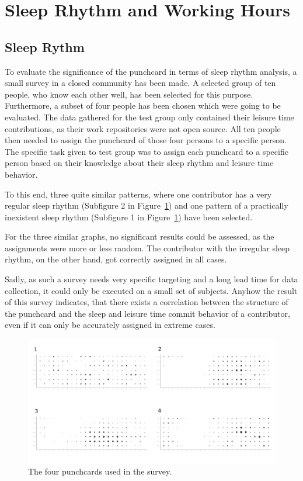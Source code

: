 \section{Sleep Rhythm and Working Hours}

\subsection{Sleep Rythm}
To evaluate the significance of the punchcard in terms of sleep rhythm analysis, a small survey in a closed community has been made.
A selected group of ten people, who know each other well, has been selected for this purpose.
Furthermore, a subset of four people has been chosen which were going to be evaluated.
The data gathered for the test group only contained their leisure time contributions, as their work repositories were not open source.
All ten people then needed to assign the punchcard of those four persons to a specific person.
The specific task given to test group was to assign each punchcard to a specific person based on their knowledge about their sleep rhythm and leisure time behavior.

To this end, three quite similar patterns, where one contributor has a very regular sleep rhythm (Subfigure 2 in Figure~\ref{fig:punchcard-survey}) and one pattern of a practically inexistent sleep rhythm (Subfigure 1 in Figure~\ref{fig:punchcard-survey}) have been selected.

For the three similar graphs, no significant results could be assessed, as the assignments were more or less random.
The contributor with the irregular sleep rhythm, on the other hand, got correctly assigned in all cases.

Sadly, as such a survey needs very specific targeting and a long lead time for data collection, it could only be executed on a small set of subjects.
Anyhow the result of this survey indicates, that there exists a correlation between the structure of the punchcard and the sleep and leisure time commit behavior of a contributor, even if it can only be accurately assigned in extreme cases.


\begin{figure}[H]
    \includegraphics[scale=0.16]{./graphs/analysis/survey_combined}
    \centering
    \caption{The four punchcards used in the survey.}\label{fig:punchcard-survey}
\end{figure}

